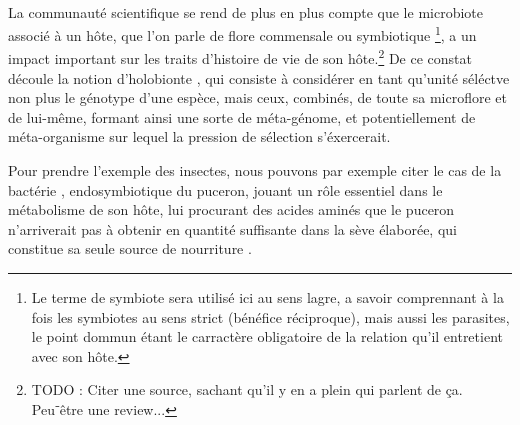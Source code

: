 
\paragraph{} %
\label{par:intro1}

La communauté scientifique se rend de plus en plus compte que le microbiote
associé à un hôte, que l'on parle de flore commensale ou symbiotique
\footnote{Le terme de symbiote sera utilisé ici au sens lagre, a savoir
comprennant à la fois les symbiotes au sens strict (bénéfice réciproque), mais
aussi les parasites, le point dommun étant le carractère obligatoire de la
relation qu'il entretient avec son hôte.}, a un impact important sur les
traits d'histoire de vie de son hôte.\footnote{TODO : Citer une source,
sachant qu'il y en a plein qui parlent de ça. Peu⁻être une review...} De ce
constat découle la notion d'holobionte \cite{rosenberg2007}, qui consiste à
considérer en tant qu'unité séléctve non plus le génotype d'une espèce, mais
ceux, combinés, de toute sa microflore et de lui-même, formant ainsi une sorte
de méta-génome, et potentiellement de méta-organisme sur lequel la pression de
sélection s'éxercerait.

Pour prendre l'exemple des insectes, nous pouvons par exemple citer le cas de
la bactérie ,  endosymbiotique du puceron, jouant un rôle
essentiel dans le métabolisme de son hôte, lui procurant des acides aminés que
le puceron n'arriverait pas à obtenir en quantité suffisante dans la sève
élaborée, qui constitue sa seule source de nourriture \cite{douglas1998}.



